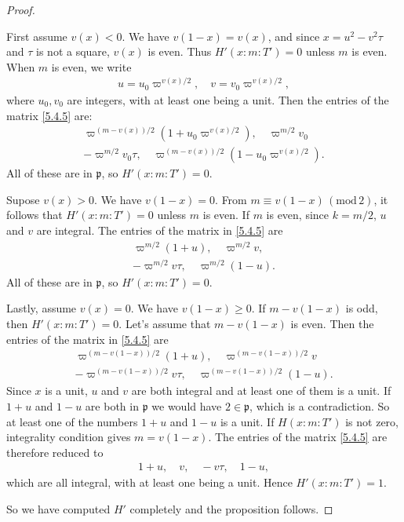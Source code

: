 \begin{proof}
\begin{itemize}
\end{itemize}
First assume $v(x) <0$.
We have $v(1-x) = v(x)$, and since $x = u^2 - v^2 \tau$ and $\tau$ is not a square, $v(x)$ is even.
Thus $H'(x:m:T')=0$ unless $m$ is even.
When $m$ is even, we write
\begin{align*}
    u = u_0 \varpi^{v(x) /2}, \quad v = v_0 \varpi^{v(x) / 2},
\end{align*}
where $u_0, v_0$ are integers, with at least one being a unit.
Then the entries of the matrix \eqref{5.4.5} are:
\begin{align*}
    \varpi^{(m  - v(x)) / 2} (1 + u_0 \varpi^{v(x) / 2}), \quad \varpi^{m/2}v_0 \\
    -\varpi^{m/2} v_0 \tau, \quad \varpi^{(m - v(x))/2} (1 - u_0 \varpi^{v(x) / 2}).
\end{align*}
All of these are in $\mathfrak{p}$, so $H'(x:m:T') = 0$.

Supose $v(x) > 0$. We have $v(1 - x) = 0$.
From $m \equiv v(1-x)\,(\mathrm{mod}\,2)$, it follows that $H'(x:m:T') = 0$ unless $m$ is even.
If $m$ is even, since $k = m / 2$, $u$ and $v$ are integral.
The entries of the matrix in \eqref{5.4.5} are
\begin{align*}
    \varpi^{m/2} (1+u), \quad \varpi^{m/2} v, \\
    -\varpi^{m/2} v\tau, \quad \varpi^{m/2} (1 - u).
\end{align*}
All of these are in $\mathfrak{p}$, so $H'(x:m:T') =0$.

Lastly, assume $v(x) = 0$. We have $v(1 - x) \geq 0$.
If $m - v(1-x)$ is odd, then $H'(x:m:T') =0$.
Let's assume that $m - v(1-x)$ is even.
Then the entries of the matrix in \eqref{5.4.5} are
\begin{align*}
    \varpi^{(m - v(1-x))/2} (1 +u), \quad \varpi^{(m - v(1-x))/2} v \\
    -\varpi^{(m - v(1-x)) /2} v\tau, \quad \varpi^{(m - v(1-x)) / 2} (1 - u).
\end{align*}
Since $x$ is a unit, $u$ and $v$ are both integral and at least one of them is a unit.
If $1 + u$ and $1 - u$ are both in $\mathfrak{p}$ we would have $2 \in \mathfrak{p}$, which is a contradiction.
So at least one of the numbers $1 + u$ and $1 - u$ is a unit.
If $H(x:m:T')$ is not zero, integrality condition gives $m = v(1-x)$.
The entries of the matrix \eqref{5.4.5} are therefore reduced to
\begin{align*}
    1+u, \quad v, \quad -v\tau, \quad 1 -u,
\end{align*}
which are all integral, with at least one being a unit.
Hence $H'(x:m:T') = 1$.

So we have computed $H'$ completely and the proposition follows.
\end{proof}

